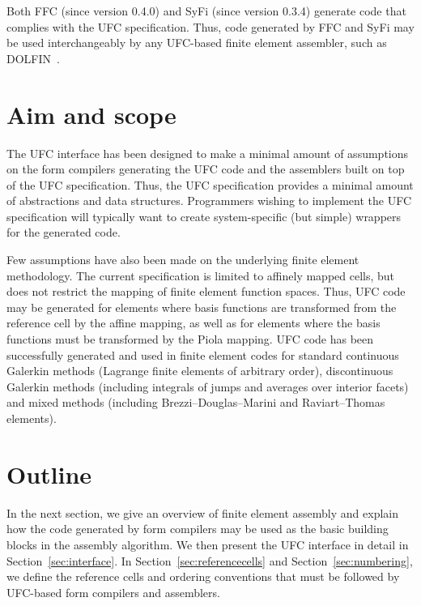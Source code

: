 Both FFC (since version 0.4.0) and SyFi (since version 0.3.4)
generate code that complies with the UFC specification. Thus, code
generated by FFC and SyFi may be used interchangeably by any UFC-based
finite element assembler, such as DOLFIN~\cite{www:dolfin}.

\section{Aim and scope}

The UFC interface has been designed to make a minimal amount of
assumptions on the form compilers generating the UFC code and the
assemblers built on top of the UFC specification. Thus, the UFC
specification provides a minimal amount of abstractions and data
structures. Programmers wishing to implement the UFC specification
will typically want to create system-specific (but simple) wrappers
for the generated code.

Few assumptions have also been made on the underlying finite element
methodology. The current specification is limited to affinely mapped
cells, but does not restrict the mapping of finite element function
spaces. Thus, UFC code may be generated for elements where basis
functions are transformed from the reference cell by the affine
mapping, as well as for elements where the basis functions must be
transformed by the Piola mapping. UFC code has been successfully
generated and used in finite element codes for standard continuous
Galerkin methods (Lagrange finite elements of arbitrary order),
discontinuous Galerkin methods (including integrals of jumps and
averages over interior facets) and mixed methods (including
Brezzi--Douglas--Marini and Raviart--Thomas elements).

\section{Outline}

In the next section, we give an overview of finite element assembly
and explain how the code generated by form compilers may be used as
the basic building blocks in the assembly algorithm. We then present
the UFC interface in detail in Section~\ref{sec:interface}. In
Section~\ref{sec:referencecells} and Section~\ref{sec:numbering}, we
define the reference cells and ordering conventions that must be
followed by UFC-based form compilers and assemblers.

